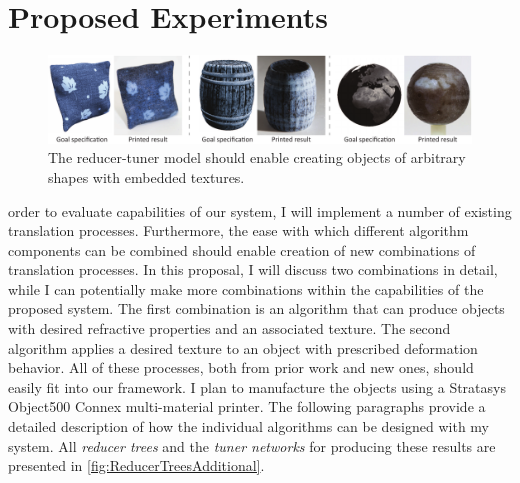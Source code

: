 \chapter{Proposed Experiments}
\label{chap:results}
\begin{figure}[t]
\includegraphics[width=\linewidth]{figure/TexturedExamples.pdf}
\caption {The reducer-tuner model should enable creating objects of arbitrary shapes with embedded textures.}
\label{fig:texturedExamples}
\end{figure}
 order to evaluate capabilities of our system, I will implement a number of existing translation processes.
Furthermore, the ease with which different algorithm components can be combined should enable creation of new combinations of translation processes. In this proposal, I will discuss two combinations in detail, while I can potentially make more combinations within the capabilities of the proposed system.
The first combination is an algorithm that can produce objects with desired refractive properties and an associated texture.
The second algorithm applies a desired texture to an object with prescribed deformation behavior.
All of these processes, both from prior work and new ones, should easily fit into our framework. I plan to manufacture the objects using a Stratasys Object500 Connex  multi-material printer.
The following paragraphs provide a detailed description of how the individual algorithms can be designed with my system.
All \emph{reducer trees} and the \emph{tuner networks} for producing these results are presented in \autoref{fig:ReducerTreesAdditional}.

